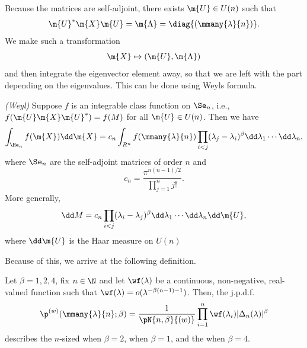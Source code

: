  Because the matrices are self-adjoint, there exists $\m{U} \in U(n)$ such that
 \begin{equation}
 	\m{U}^* \m{X} \m{U} = \m{\Lambda} = \diag{(\mmany{\lambda}{n})}.
 \end{equation} 
 We make such a transformation
 \begin{equation}
 	\m{X} \mapsto (\m{U}, \m{\Lambda})	
 \end{equation}
 and then integrate the eigenvector element away, so that we are left with the part depending on the eigenvalues. This can be done using Weyls formula.
 \begin{teorema}
 	\textit{(Weyl)} Suppose $f$ is an integrable class function on $\Se_n$, i.e., $f(\m{U} \m{X} \m{U}^*) = f(M)$ for all $\m{U} \in U(n)$. Then we have
 	\begin{equation}
 		\int_{\He_n} f(\m{X}) \dd \m{X} = c_n \int_{R^n} f(\mmany{\lambda}{n}) \prod_{i < j} (\lambda_j - \lambda_i)^\beta \dd \lambda_1 \cdots \dd \lambda_n,
 	\end{equation}
 	where $\Se_n$ are the self-adjoint matrices of order $n$ and
 	\begin{equation}
 		c_n = \frac{\pi^{n(n-1)/2}}{\prod_{j=1}^{n} j!}.
 	\end{equation}
 	More generally, 
 	\begin{equation}
 		\dd M = c_n \prod_{i < j} (\lambda_i - \lambda_j)^\beta  \dd \lambda_1 \cdots \dd \lambda_n \dd \m{U},
 	\end{equation}
 	where $\dd \m{U}$ is the Haar measure on $U(n)$
 \end{teorema}
 Because of this, we arrive at the following definition.
 \begin{definicao}
 	Let $\beta = 1, 2, 4$, fix $n \in \N$ and let $\wf(\lambda)$ be a continuous, non-negative, real-valued function such that $\wf(\lambda) = o(\lambda^{-\beta(n-1)-1})$. Then, the j.p.d.f.
 	\begin{equation}
 		\p^{(w)}(\mmany{\lambda}{n};\beta) = \frac{1}{\pN{n,\beta}{(w)}} \prod_{i=1}^{n} \wf(\lambda_i) |\Delta_n(\lambda)|^\beta
 	\end{equation}
 	describes the $n$-sized  when $\beta = 2$,  when $\beta=1$, and the  when $\beta = 4$.
 	\label{Definition: measure-weight}
 \end{definicao}
 
